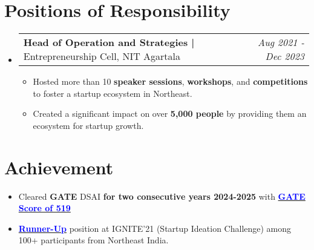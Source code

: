 \documentclass[a4paper,11pt]{article}
\makeatletter
\newcommand{\resumePOR}[3]{
\vspace{0.5mm}\item
    \begin{tabular*}{0.97\textwidth}[t]{l@{\extracolsep{\fill}}r}
        \textbf{#1}\hspace{0.3mm}#2 & \textit{\small{#3}} 
    \end{tabular*}
    \vspace{-2mm}
}
\newcommand{\resumeSubHeadingListStart}{\begin{itemize}[leftmargin=*,labelsep=0mm]}
\newcommand{\resumeItemListStart}{\begin{justify}\begin{itemize}[leftmargin=3ex, rightmargin=2ex, noitemsep,labelsep=1.2mm,itemsep=0mm]\small}
\newcommand{\resumeSubHeadingListEnd}{\end{itemize}\vspace{2mm}}
\newcommand{\resumeItemListEnd}{\end{itemize}\end{justify}\vspace{-2mm}}
\makeatother
\begin{document}
\section{\textbf{Positions of Responsibility}}
\vspace{-0.4mm}
\resumeSubHeadingListStart
\resumePOR{Head of Operation and Strategies | } %
    {Entrepreneurship Cell, NIT Agartala} %
    {Aug 2021 - Dec 2023} %
    \resumeItemListStart
\item Hosted more than 10 \textbf{speaker sessions}, \textbf{workshops}, and \textbf{competitions} to foster a startup ecosystem in Northeast.
    \item Created a significant impact on over \textbf{5,000 people} by providing them an ecosystem for startup growth.
    \resumeItemListEnd

\resumeSubHeadingListEnd
\vspace{-5mm}

\section{\textbf{Achievement}}
\vspace{-0.4mm}

    \resumeItemListStart
\item Cleared \textbf{GATE} DSAI \textbf{for two consecutive years 2024-2025} with \textbf{\href{https://drive.google.com/file/d/1UpbCIcsCu5D63btW4_GaFTny7aUMrL-z/view?usp=sharing}{\textcolor{blue}{GATE Score of 519}}}
    \item \textbf{\href{https://drive.google.com/file/d/1mtsd7VvkWesBoY2TFoTx8x9AE_BZCOOp/view?usp=drivesdk}{\textcolor{blue}{Runner-Up}}} position at IGNITE’21 (Startup Ideation Challenge) among 100+ participants from Northeast India.
    \resumeItemListEnd




    
\end{document}
